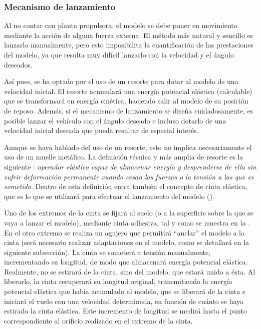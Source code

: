 \subsubsection{Mecanismo de lanzamiento}
\label{sec:tests:preparation:mechanism}

Al no contar con planta propulsora, el modelo se debe poner en movimiento mediante la acción de alguna fuerza externa. El método más natural y sencillo es lanzarlo manualmente, pero esto imposibilita la cuantificación de las prestaciones del modelo, ya que resulta muy difícil lanzarlo con la velocidad y el ángulo deseados.

Así pues, se ha optado por el uso de un resorte para dotar al modelo de una velocidad inicial. El resorte acumulará una energía potencial elástica (calculable) que se transformará en energía cinética, haciendo salir al modelo de su posición de reposo. Además, si el mecanismo de lanzamiento se diseña cuidadosamente, es posible lanzar el vehículo con el ángulo deseado e incluso dotarlo de una velocidad inicial deseada que pueda resultar de especial interés.

Aunque se haya hablado del uso de un resorte, esto no implica necesariamente el uso de un muelle metálico. La definición técnica y más amplia de resorte es la siguiente \cite{ref:resorte}: \emph{operador elástico capaz de almacenar energía y desprenderse de ella sin sufrir deformación permanente cuando cesan las fuerzas o la tensión a las que es sometido}. Dentro de esta definición entra también el concepto de cinta elástica, que es lo que se utilizará para efectuar el lanzamiento del modelo ().

Uno de los extremos de la cinta se fijará al suelo (o a la superficie sobre la que se vaya a lanzar el modelo), mediante cinta adhesiva, tal y como se muestra en la . En el otro extremo se realiza un agujero que permitirá “anclar” el modelo a la cinta (será necesario realizar adaptaciones en el modelo, como se detallará en la siguiente subsección). La cinta se someterá a tensión manualmente, incrementando su longitud, de modo que almacenará energía potencial elástica. Realmente, no se estirará de la cinta, sino del modelo, que estará unido a ésta. Al liberarlo, la cinta recuperará su longitud original, transmitiendo la energía potencial elástica que había acumulado al modelo, que se liberará de la cinta e iniciará el vuelo con una velocidad determinada, en función de cuánto se haya estirado la cinta elástica. Este incremento de longitud se medirá hasta el punto correspondiente al orificio realizado en el extremo de la cinta.


